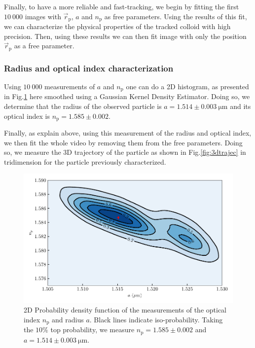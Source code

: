 Finally, to have a more reliable and fast-tracking, we begin by fitting the first $10~000$ images with  $\vec{r}_\mathrm{p}$, $a$ and $n_\mathrm{p}$ as free parameters. Using the results of this fit, we can characterize the physical properties of the tracked colloid with high precision. Then, using these results we can then fit image with only the position $\vec{r}_\mathrm{p} $ as a free parameter.




\subsubsection{Radius and optical index characterization}
\label{sec:radius_charac}

Using $10 ~ 000$ measurements of $a$ and $n_\mathrm{p}$ one can do a 2D histogram, as presented in Fig.\ref{fig:KDErn} here smoothed using a Gaussian Kernel Density Estimator. Doing so, we determine that the radius of the observed particle is $a=1.514 \pm 0.003 ~ \mathrm{\mu m} $ and its optical index is $n_\mathrm{p} = 1.585 \pm 0.002$.





Finally, as explain above, using this measurement of the radius and optical index, we then fit the whole video by removing them from the free parameters. Doing so, we measure the 3D trajectory of the particle as shown in Fig.\ref{fig:3dtrajec} in tridimension for the particle previously characterized.

\begin{figure}[!ht]
	\centering
	\includegraphics{02_body/chapter2/images/r_n_measurements/KDErn.pdf}
	\caption{2D Probability density function of the measurements of the optical index $n_\mathrm{p}$ and radius $a$. Black lines indicate iso-probability. Taking the $10\% $ top probability, we measure $n_\mathrm{p} = 1.585 \pm 0.002$ and $a=1.514 \pm 0.003 ~ \mathrm{\mu m}$.~\href{https://github.com/eXpensia/Confined-Brownian-Motion/blob/main/02_body/chapter2/images/r_n_measurements/mesure\%20n\%20r.ipynb}{\faGithub} }
	\label{fig:KDErn}
\end{figure}

